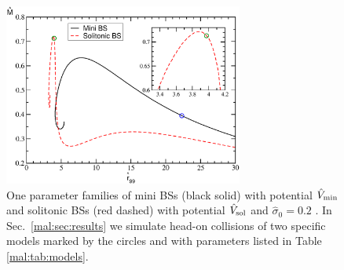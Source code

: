 %
\begin{figure}[h!]
    \centering
    \includegraphics[width=0.7\textwidth]{malaise_source/statBS.pdf}
    \caption{One parameter families of mini BSs (black solid) with
    potential $\hat{V}_{\rm min}$ and solitonic
    BSs (red dashed) with potential $\hat{V}_{\rm sol}$ and
    $\hat{\sigma}_0=0.2$ . In
    Sec.~\ref{mal:sec:results} we simulate head-on collisions of two
    specific models marked by the circles and with parameters listed
    in Table \ref{mal:tab:models}.
    }
    \label{mal:fig:statBS}
\end{figure}
%


